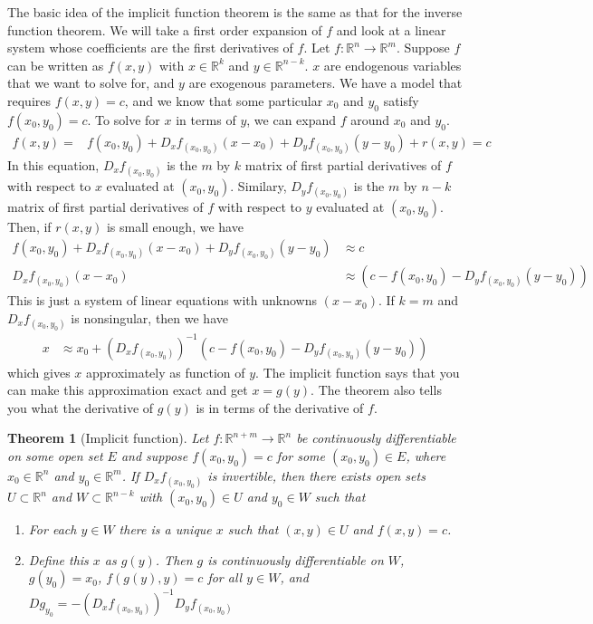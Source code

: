 \documentclass[12pt,reqno]{amsart}
\newtheorem{theorem}{Theorem}[section]
\theoremstyle{definition}
\def\R{\mathbb{R}}
\renewcommand{\to}{{\rightarrow}}
\begin{document}
The basic idea of the implicit function theorem is the same as that
for the inverse function theorem. We will take a first order expansion
of $f$ and look at a linear system whose coefficients are the first
derivatives of $f$. Let $f: \R^n \to \R^m$. Suppose $f$ can be written
as $f(x,y)$ with $x \in \R^k$ and $y \in \R^{n-k}$. $x$ are endogenous
variables that we want to solve for, and $y$ are exogenous
parameters. We have a model that requires $f(x,y) = c$, and we know
that some particular $x_0$ and $y_0$ satisfy $f(x_0,y_0) = c$. To
solve for $x$ in terms of $y$, we can expand $f$ around $x_0$ and
$y_0$. 
\begin{align*}
  f(x,y) = & f(x_0,y_0) + D_xf_{(x_0,y_0)} (x-x_0) + D_yf_{(x_0,y_0)}
  (y-y_0) + r(x,y) = c 
\end{align*}
In this equation, $D_xf_{(x_0,y_0)}$ is the $m$ by $k$ matrix of first
partial derivatives of $f$ with respect to $x$ evaluated at
$(x_0,y_0)$. Similary,  $D_yf_{(x_0,y_0)}$ is the $m$ by $n-k$ matrix of first
partial derivatives of $f$ with respect to $y$ evaluated at
$(x_0,y_0)$.  Then, if $r(x,y)$ is small enough, we have
\begin{align*}
  f(x_0,y_0) + D_xf_{(x_0,y_0)} (x-x_0) + D_yf_{(x_0,y_0)}
 (y-y_0) & \approx c \\
 D_xf_{(x_0,y_0)} (x-x_0) & \approx \left(c -  f(x_0,y_0) -
   D_yf_{(x_0,y_0)} (y-y_0)\right) 
\end{align*}
This is just a system of linear equations with unknowns $(x-x_0)$. If
$k=m$ and $D_xf_{(x_0,y_0)}$ is nonsingular, then we have
\begin{align*}
  x & \approx x_0 + \left(D_x f_{(x_0,y_0)}\right)^{-1} \left(c -  f(x_0,y_0) -
   D_yf_{(x_0,y_0)} (y-y_0)\right) 
\end{align*}
which gives $x$ approximately as function of $y$. The implicit
function says that you can make this approximation exact and get
$x=g(y)$. The theorem also tells you what the derivative of $g(y)$ is
in terms of the derivative of $f$.
\begin{theorem}[Implicit function]\label{thm:implicit}
  Let $f:\R^{n+m} \to \R^n$ be continuously differentiable on some open
  set $E$ and suppose $f(x_0,y_0) = c$ for some $(x_0,y_0) \in E$,
  where $x_0 \in \R^n$ and $y_0 \in \R^m$. If 
  $D_xf_{(x_0,y_0)}$ is invertible, then there exists open sets $U
  \subset \R^n$ and $W \subset \R^{n-k}$ with $(x_0,y_0) \in U$ and
  $y_0 \in W$ such that 
  \begin{enumerate}
  \item\label{imp1} 
    For each $y\in W$ there is a unique $x$ such that $(x,y) \in
    U$ and $f(x,y) = c$.
  \item\label{imp2}
    Define this $x$ as $g(y)$. Then $g$ is continuously
    differentiable on $W$, $g(y_0) = x_0$,
    $f(g(y),y) = c$ for all $y
    \in W$, and $Dg_{y_0} = -\left(D_xf_{(x_0,y_0)}\right)^{-1}
    D_yf_{(x_0,y_0)}$ 
  \end{enumerate}
\end{theorem}
\end{document}
